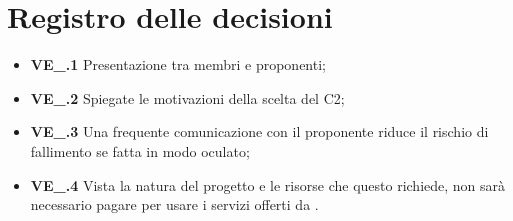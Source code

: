 \section{Registro delle decisioni}
\begin{itemize}
  \item \textbf{VE\_\Data.1} Presentazione tra membri e proponenti;
  \item \textbf{VE\_\Data.2} Spiegate le motivazioni della scelta del  C2;
  \item \textbf{VE\_\Data.3} Una frequente comunicazione con il proponente riduce il rischio di fallimento se fatta in modo oculato;
  \item \textbf{VE\_\Data.4} Vista la natura del progetto e le risorse che questo richiede, non sarà necessario pagare per usare i servizi offerti da .
\end{itemize}